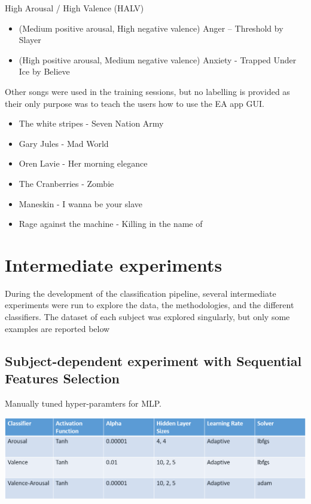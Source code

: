 High Arousal / High Valence (HALV)
\begin{itemize}
\item  (Medium positive arousal, High negative valence) Anger – Threshold by Slayer
\item  (High positive arousal, Medium negative valence) Anxiety - Trapped Under Ice by Believe
\end{itemize}

Other songs were used in the training sessions, but no labelling is provided as their only purpose was 
to teach the users how to use the EA app GUI.
\begin{itemize}
\item  The white stripes - Seven Nation Army
\item  Gary Jules - Mad World
\item  Oren Lavie - Her morning elegance
\item  The Cranberries - Zombie
\item  Maneskin - I wanna be your slave
\item  Rage against the machine - Killing in the name of
\end{itemize}



\section{Intermediate experiments}
\label{sec:appendix_A3}
During the development of the classification pipeline, several intermediate experiments were run to
explore the data, the methodologies, and the different classifiers. The dataset of each subject was 
explored singularly, but only some examples are reported below

\subsection{Subject-dependent experiment with Sequential Features Selection}
\label{sec:appendix_A3.1}
\begin{table}[h!]
  \caption{Manually tuned hyper-paramters for MLP.}
  \label{tbl:mlp_initial_parameters}
  \includegraphics[width=\linewidth]{img/appendix/mlp_initial_parameters.png}
\end{table}

